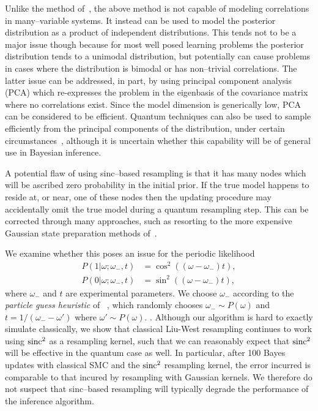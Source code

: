 \documentclass[aps,amsmath,onecolumn,amssymb]{revtex4}
\begin{document}
Unlike the method of~\cite{KW08}, the above method is not capable of modeling correlations in many--variable systems.  It instead can be used to  model the posterior distribution as a product of independent distributions.  This tends not to be a major issue though because for most well posed learning problems the posterior distribution tends to a unimodal distribution, but potentially can cause problems in cases where the distribution is bimodal or has non--trivial correlations.  The latter issue can be addressed, in part, by using principal component analysis (PCA) which re-expresses the problem in the eigenbasis of the covariance matrix where no correlations exist.  Since the model dimension is generically low, PCA can be considered to be efficient.  Quantum techniques can also be used to sample efficiently from the principal components of the distribution, under certain circumstances~\cite{LMR14}, although it is uncertain whether this capability will be of general use in Bayesian inference.

A potential flaw of using sinc--based resampling is that it has many nodes
which will be ascribed zero probability in the initial prior.  If the true
model happens to reside at, or near, one of these nodes then the updating
procedure may accidentally omit the true model during a quantum resampling
step.  
This can be corrected through many approaches, such as resorting to the
more expensive Gaussian state preparation methods of~\cite{GR02,KW08}.   

We examine whether this poses an issue for the periodic likelihood 
\begin{align}
P(1 | \omega; \omega_-, t) &= \cos^2 ((\omega-\omega_-)  t),\nonumber\\
P(0 | \omega; \omega_-, t) &= \sin^2 ((\omega-\omega_-)  t),\label{eq:simple-precession}
\end{align}
where $\omega_-$ and $t$ are experimental parameters.  We choose $\omega_-$ according to the \emph{particle guess heuristic} of~\cite{wiebe_Hamiltonian_2014}
, which randomly chooses $\omega_- \sim P(\omega)$ and $t=1/(\omega_- - \omega')$ where $\omega' \sim P(\omega)$.
.  Although our algorithm is hard to exactly simulate classically, we show
that classical Liu-West resampling continues to work using $\operatorname{sinc}^2$ as a
resampling kernel, such that we can reasonably expect that $\operatorname{sinc}^2$ will be
effective in the quantum case as well. In particular,
after 100 Bayes updates with classical SMC and the $\operatorname{sinc}^2$ resampling kernel,
the error incurred is comparable to that incured by resampling with Gaussian
kernels.  We therefore do not suspect that sinc--based resampling will typically degrade the performance of the inference algorithm.
\end{document}
